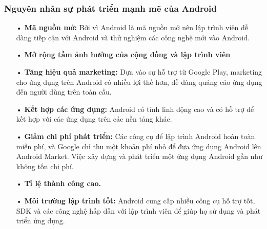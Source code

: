 \documentclass[a4paper]{article}
\begin{document}
\subsubsection{Nguyên nhân sự phát triển mạnh mẽ của Android}
\begin{itemize}
	\item[•] \textbf{Mã nguồn mở:} Bởi vì Android là mã nguồn mở nên lập trình viên dễ dàng tiếp cận với Android và thử nghiệm các công nghệ mới vào Android.
	\item[•] \textbf{Mở rộng tầm ảnh hưởng của cộng đồng và lập trình viên}
	\item[•] \textbf{Tăng hiệu quả marketing:} Dựa vào sự hỗ trợ từ Google Play, marketing cho ứng dụng trên Android có nhiều lợi thế hơn, dễ dàng quảng cáo ứng dụng đến người dùng trên toàn cầu.
	\item[•] \textbf{Kết hợp các ứng dụng:} Android có tính linh động cao và có hỗ trợ để kết hợp với các ứng dụng trên các nền tảng khác.
	\item[•] \textbf{Giảm chi phí phát triển: }Các công cụ để lập trình Android hoàn toàn miễn phí, và Google chỉ thu một khoản phí nhỏ để đưa ứng dụng Android lên Android Market. Việc xây dựng và phát triển một ứng dụng Android gần như không tốn chi phí.
	\item[•] \textbf{Tỉ lệ thành công cao.}
	\item[•] \textbf{Môi trường lập trình tốt:} Android cung cấp nhiều công cụ hỗ trợ tốt, SDK và các công nghệ hấp dẫn với lập trình viên để giúp họ sử dụng và phát triển ứng dụng.
\end{itemize}
\end{document}
